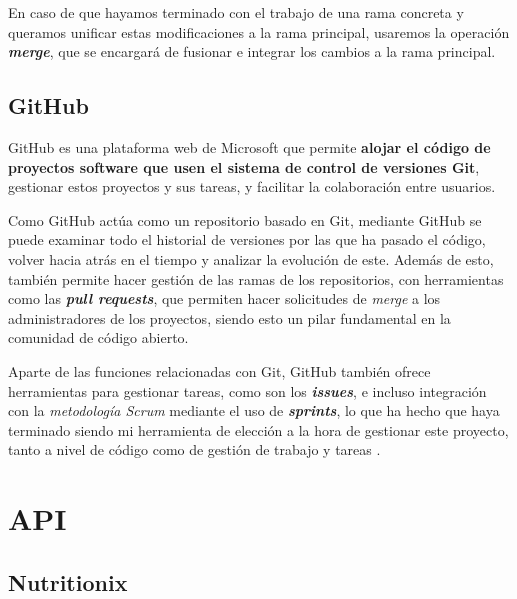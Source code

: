 
En caso de que hayamos terminado con el trabajo de una rama concreta y queramos unificar estas modificaciones a la rama principal, usaremos la operación \textit{\textbf{merge}}, que se encargará de fusionar e integrar los cambios a la rama principal. \cite{git:git-basics}

\subsection{GitHub}


GitHub es una plataforma web de Microsoft que permite \textbf{alojar el código de proyectos software que usen el sistema de control de versiones Git}, gestionar estos proyectos y sus tareas, y facilitar la colaboración entre usuarios.

Como GitHub actúa como un repositorio basado en Git, mediante GitHub se puede examinar todo el historial de versiones por las que ha pasado el código, volver hacia atrás en el tiempo y analizar la evolución de este. Además de esto, también permite hacer gestión de las ramas de los repositorios, con herramientas como las \textit{\textbf{pull requests}}, que permiten hacer solicitudes de \textit{merge} a los administradores de los proyectos, siendo esto un pilar fundamental en la comunidad de código abierto.

Aparte de las funciones relacionadas con Git, GitHub también ofrece herramientas para gestionar tareas, como son los \textit{\textbf{issues}}, e incluso integración con la \textit{metodología Scrum} mediante el uso de \textit{\textbf{sprints}}, lo que ha hecho que haya terminado siendo mi herramienta de elección a la hora de gestionar este proyecto, tanto a nivel de código como de gestión de trabajo y tareas \cite{wikipedia:github}.


\section{API}


\subsection{Nutritionix}


